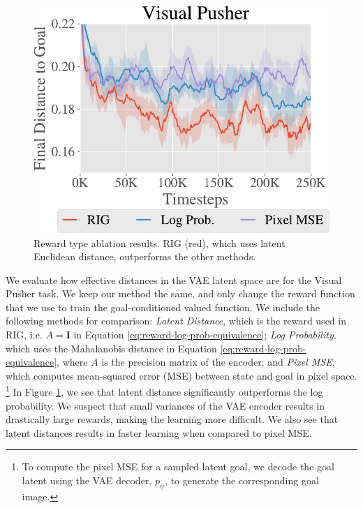 \begin{figure}
    \centering
    \vspace{-0.2in}
    \includegraphics[width=\linewidth]{rig/img/pusher_reward_type_ablation_main.pdf}
    \vspace{-0.2in}
    \caption{Reward type ablation results. RIG (red), which uses latent Euclidean distance, outperforms the other methods.}
    \vspace{-0.1in}
    \label{fig:reward-ablation}
\end{figure}
We evaluate how effective distances in the VAE latent space are for the Visual Pusher task.
We keep our method the same, and only change the reward function that we use to train the goal-conditioned valued function.
We include the following methods for comparison:
\textit{Latent Distance}, which is the reward used in RIG, i.e. $A = \mathbf{I}$ in Equation \eqref{eq:reward-log-prob-equivalence};
\textit{Log Probability}, which uses the Mahalanobis distance in Equation \eqref{eq:reward-log-prob-equivalence}, where $A$ is the precision matrix of the encoder;
and \textit{Pixel MSE}, which computes mean-squared error (MSE) between state and goal in pixel space.
\footnote{To compute the pixel MSE for a sampled latent goal, we decode the goal latent using the VAE decoder, $p_\psi$, to generate the corresponding goal image.}
In Figure \ref{fig:reward-ablation}, we see that latent distance significantly outperforms the log probability.
We suspect that small variances of the VAE encoder results in drastically large rewards, making the learning more difficult.
We also see that latent distances results in faster learning when compared to pixel MSE.

